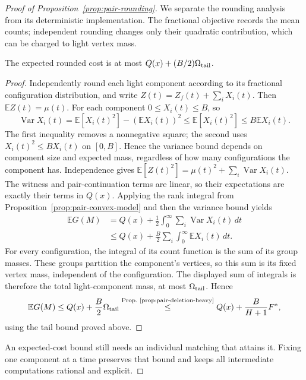 \begin{proof}[Proof of Proposition~\ref{prop:pair-rounding}]
We separate the rounding analysis from its deterministic implementation.
The fractional objective records the mean counts; independent rounding
changes only their quadratic contribution, which can be charged to
light vertex mass.

\begin{claim}
\label{clm:pair-rounding-variance}
The expected rounded cost is at most $Q(x)+(B/2)\Omega_{\rm tail}$.
\end{claim}
\begin{proof}
Independently round each light component according to its fractional
configuration distribution, and write
$Z(t)=Z_f(t)+\sum_iX_i(t)$. Then $\mathbb EZ(t)=\mu(t)$.
For each component $0\le X_i(t)\le B$, so
\[
 \operatorname{Var}X_i(t)
 =\mathbb E[X_i(t)^2]-(\mathbb EX_i(t))^2
 \le\mathbb E[X_i(t)^2]\le B\mathbb EX_i(t).
\]
The first inequality removes a nonnegative square; the second uses
$X_i(t)^2\le BX_i(t)$ on $[0,B]$. Hence the variance bound depends
on component size and expected mass, regardless of how many
configurations the component has.
Independence gives
$\mathbb E[Z(t)^2]=\mu(t)^2+\sum_i\operatorname{Var}X_i(t)$.
The witness and pair-continuation terms are linear, so their expectations
are exactly their terms in $Q(x)$. Applying the rank integral from
Proposition~\ref{prop:pair-convex-model} and then the variance bound yields
\begin{align*}
 \mathbb EG(M)
 &=Q(x)+\frac12\int_0^\infty
                 \sum_i\operatorname{Var}X_i(t)\,dt\\
 &\le Q(x)+\frac B2\sum_i
                  \int_0^\infty\mathbb EX_i(t)\,dt.
\end{align*}
For every configuration, the integral of its count function is the
sum of its group masses. These groups partition the component's
vertices, so this sum is its fixed vertex mass, independent of the
configuration. The displayed sum of integrals is therefore the total
light-component mass, at most $\Omega_{\rm tail}$. Hence
\[
 \mathbb EG(M)\le Q(x)+\frac B2\Omega_{\rm tail}
                 \byref{Prop.}{prop:pair-deletion-heavy}{\le} Q(x)+\frac B{H+1}F^*,
\]
using the tail bound proved above.
\end{proof}
An expected-cost bound still needs an individual matching that attains
it. Fixing one component at a time preserves that bound and keeps
all intermediate computations rational and explicit.


\end{proof}
